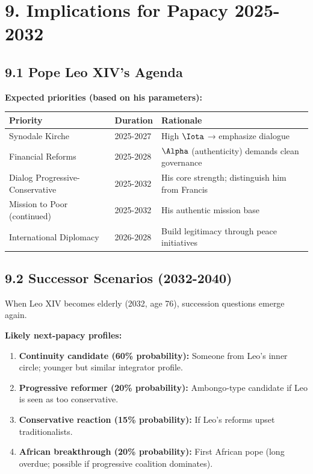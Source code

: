 \section{9. Implications for Papacy 2025-2032}

\subsection{9.1 Pope Leo XIV's Agenda}

\textbf{Expected priorities (based on his parameters):}

\begin{table}[h]
\centering
\begin{tabular}{|l|l|l|}
\hline
\textbf{Priority} & \textbf{Duration} & \textbf{Rationale} \\
\hline
Synodale Kirche & 2025-2027 & High $\Iota$ → emphasize dialogue \\
Financial Reforms & 2025-2028 & $\Alpha$ (authenticity) demands clean governance \\
Dialog Progressive-Conservative & 2025-2032 & His core strength; distinguish him from Francis \\
Mission to Poor (continued) & 2025-2032 & His authentic mission base \\
International Diplomacy & 2026-2028 & Build legitimacy through peace initiatives \\
\hline
\end{tabular}
\end{table}

\subsection{9.2 Successor Scenarios (2032-2040)}

When Leo XIV becomes elderly (2032, age 76), succession questions emerge again.

\textbf{Likely next-papacy profiles:}

\begin{enumerate}
\item \textbf{Continuity candidate (60\% probability):} Someone from Leo's inner circle; younger but similar integrator profile.

\item \textbf{Progressive reformer (20\% probability):} Ambongo-type candidate if Leo is seen as too conservative.

\item \textbf{Conservative reaction (15\% probability):} If Leo's reforms upset traditionalists.

\item \textbf{African breakthrough (20\% probability):} First African pope (long overdue; possible if progressive coalition dominates).
\end{enumerate}


